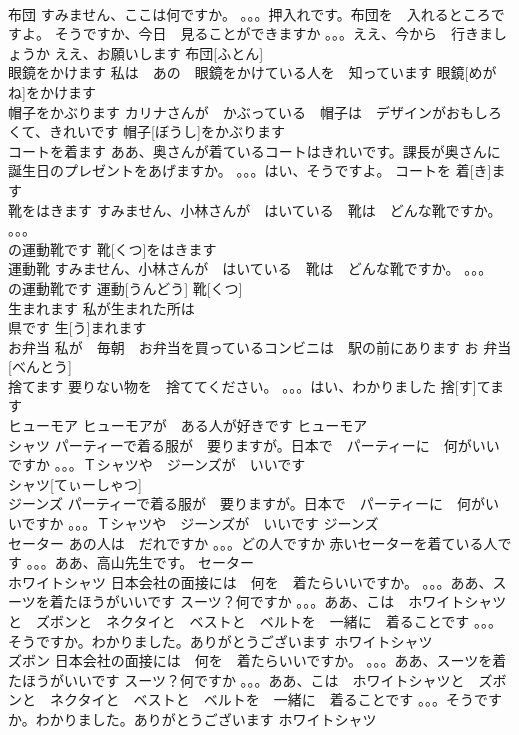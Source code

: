\documentclass[8pt]{extreport}
\begin{document}
\begin{CJK}{UTF8}{min}
\\	布団	すみません、ここは何ですか。 。。。押入れです。布団を　入れるところですよ。 そうですか、今日　見ることができますか 。。。ええ、今から　行きましょうか ええ、お願いします	布団[ふとん]			
\\	眼鏡をかけます	私は　あの　眼鏡をかけている人を　知っています	眼鏡[めがね]をかけます			
\\	帽子をかぶります	カリナさんが　かぶっている　帽子は　デザインがおもしろくて、きれいです	帽子[ぼうし]をかぶります						
\\	コートを着ます	ああ、奥さんが着ているコートはきれいです。課長が奥さんに誕生日のプレゼントをあげますか。 。。。はい、そうですよ。	コートを 着[き]ます			
\\	靴をはきます	すみません、小林さんが　はいている　靴は　どんな靴ですか。 。。。
\\	の運動靴です	靴[くつ]をはきます			
\\	運動靴	すみません、小林さんが　はいている　靴は　どんな靴ですか。 。。。
\\	の運動靴です	運動[うんどう] 靴[くつ]			
\\	生まれます	私が生まれた所は
\\	県です	生[う]まれます			
\\	お弁当	私が　毎朝　お弁当を買っているコンビニは　駅の前にあります	お 弁当[べんとう]			
\\	捨てます	要りない物を　捨ててください。 。。。はい、わかりました	捨[す]てます			
\\	ヒューモア	ヒューモアが　ある人が好きです	ヒューモア			
\\	シャツ	パーティーで着る服が　要りますが。日本で　パーティーに　何がいいですか 。。。Ｔシャツや　ジーンズが　いいです	
\\	シャツ[てぃーしゃつ]			
\\	ジーンズ	パーティーで着る服が　要りますが。日本で　パーティーに　何がいいですか 。。。Ｔシャツや　ジーンズが　いいです	ジーンズ			
\\	セーター	あの人は　だれですか 。。。どの人ですか 赤いセーターを着ている人です 。。。ああ、高山先生です。	セーター			
\\	ホワイトシャツ	日本会社の面接には　何を　着たらいいですか。 。。。ああ、スーツを着たほうがいいです スーツ？何ですか 。。。ああ、こは　ホワイトシャツと　ズボンと　ネクタイと　ベストと　ベルトを　一緒に　着ることです 。。。そうですか。わかりました。ありがとうございます	ホワイトシャツ			
\\	ズボン	日本会社の面接には　何を　着たらいいですか。 。。。ああ、スーツを着たほうがいいです スーツ？何ですか 。。。ああ、こは　ホワイトシャツと　ズボンと　ネクタイと　ベストと　ベルトを　一緒に　着ることです 。。。そうですか。わかりました。ありがとうございます	ホワイトシャツ			

\end{CJK}
\end{document}

